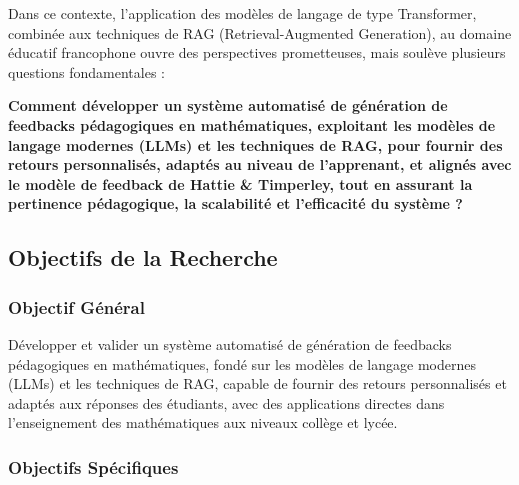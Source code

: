 Dans ce contexte, l'application des modèles de langage de type Transformer, combinée aux techniques de RAG (Retrieval-Augmented Generation), au domaine éducatif francophone ouvre des perspectives prometteuses, mais soulève plusieurs questions fondamentales :

\textbf{Comment développer un système automatisé de génération de feedbacks pédagogiques en mathématiques, exploitant les modèles de langage modernes (LLMs) et les techniques de RAG, pour fournir des retours personnalisés, adaptés au niveau de l'apprenant, et alignés avec le modèle de feedback de Hattie \& Timperley, tout en assurant la pertinence pédagogique, la scalabilité et l'efficacité du système ?}

\subsection{Objectifs de la Recherche}

\subsubsection{Objectif Général}

Développer et valider un système automatisé de génération de feedbacks pédagogiques en mathématiques, fondé sur les modèles de langage modernes (LLMs) et les techniques de RAG, capable de fournir des retours personnalisés et adaptés aux réponses des étudiants, avec des applications directes dans l'enseignement des mathématiques aux niveaux collège et lycée.

\subsubsection{Objectifs Spécifiques}

